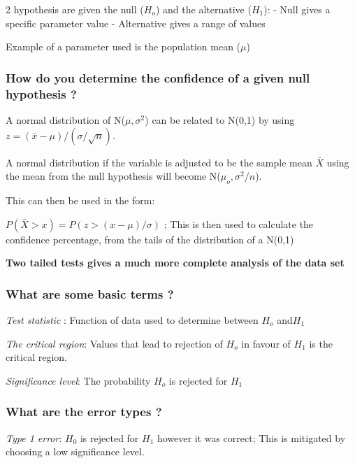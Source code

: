 \documentclass[
]{article}
\begin{document}
2 hypothesis are given the null (\(H_o\)) and the alternative (\(H_1\)):
- Null gives a specific parameter value - Alternative gives a range of
values

Example of a parameter used is the population mean (\(\mu\))

\hypertarget{how-do-you-determine-the-confidence-of-a-given-null-hypothesis}{%
\subsubsection{How do you determine the confidence of a given null
hypothesis
?}\label{how-do-you-determine-the-confidence-of-a-given-null-hypothesis}}

A normal distribution of N(\(\mu, \sigma^2\)) can be related to N(0,1)
by using \(z = (\bar{x} - \mu)/ (\sigma/\sqrt{n})\).

A normal distribution if the variable is adjusted to be the sample mean
\(\bar{X}\) using the mean from the null hypothesis will become
N(\(\mu_o,\sigma^2/n\)).

This can then be used in the form:

\(P(\bar{X} > x) = P(z > (x-\mu) /\sigma)\) ; This is then used to
calculate the confidence percentage, from the tails of the distribution
of a N(0,1)

\textbf{Two tailed tests gives a much more complete analysis of the data
set}

\hypertarget{what-are-some-basic-terms}{%
\subsubsection{What are some basic terms
?}\label{what-are-some-basic-terms}}

\emph{Test statistic} : Function of data used to determine between
\(H_o\) and\(H_1\)

\emph{The critical region}: Values that lead to rejection of \(H_o\) in
favour of \(H_1\) is the critical region.

\emph{Significance level}: The probability \(H_o\) is rejected for
\(H_1\)

\hypertarget{what-are-the-error-types}{%
\subsubsection{What are the error types
?}\label{what-are-the-error-types}}

\emph{Type 1 error}: \(H_0\) is rejected for \(H_1\) however it was
correct; This is mitigated by choosing a low significance level.
\end{document}
